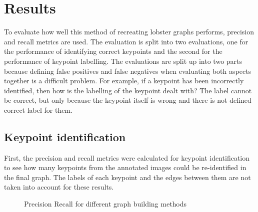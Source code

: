 \section{Results}\label{sec:results}
\newcommand{\resultspath}{tex/results}
To evaluate how well this method of recreating lobster graphs performs, precision and recall metrics are used. The evaluation is split into two evaluations, one for the performance of identifying correct keypoints and the second for the performance of keypoint labelling. The evaluations are split up into two parts because defining false positives and false negatives when evaluating both aspects together is a difficult problem. For example, if a keypoint has been incorrectly identified, then how is the labelling of the keypoint dealt with? The label cannot be correct, but only because the keypoint itself is wrong and there is not defined correct label for them. 

\subsection{Keypoint identification}
First, the precision and recall metrics were calculated for keypoint identification to see how many keypoints from the annotated images could be re-identified in the final graph. The labels of each keypoint and the edges between them are not taken into account for these results. 

\begin{figure}[H]
\centering
{}
\caption{Precision Recall for different graph building methods}
\end{figure}

